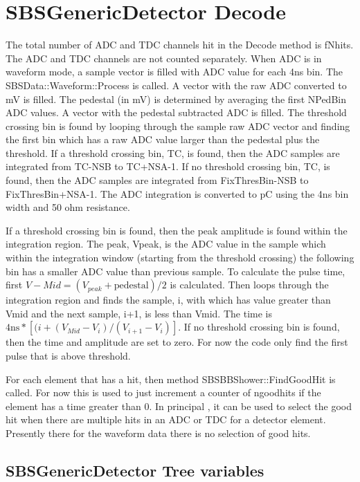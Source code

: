 \documentclass[11pt]{article}
\begin{document}
 


\section{SBSGenericDetector Decode}
The total number of  ADC and TDC channels hit in the Decode method is fNhits. The ADC and TDC channels
are not counted separately. When ADC is in waveform mode, a sample vector is filled with ADC value for
each 4ns bin. The SBSData::Waveform::Process is called.
A vector with the raw ADC converted to mV is filled. The pedestal (in mV) is determined by averaging the first NPedBin ADC values. A vector with the pedestal subtracted ADC is filled.
The threshold crossing bin is found by looping through the sample raw ADC vector and finding the first bin which has a raw ADC value larger than the pedestal plus the threshold.
If a threshold crossing bin, TC, is found, then the ADC samples are integrated from TC-NSB to TC+NSA-1.
If no  threshold crossing bin, TC, is found, then the ADC samples are integrated from FixThresBin-NSB to FixThresBin+NSA-1.
The ADC integration is converted to pC using the 4ns bin width and 50 ohm resistance.

If a threshold crossing bin is found, then the peak amplitude is found within the integration region. The peak, Vpeak,  is the ADC value in the sample which within the integration window (starting from the threshold crossing) the following bin has a smaller ADC value than previous sample.
To calculate the pulse time, first  $V-{Mid} = (V_{peak} + \mbox{pedestal})/2$ is calculated. Then loops through the
integration region and finds the sample, i, with which has value greater than Vmid and the next sample, i+1, is
less than Vmid. The time is $4\mbox{ns}*\left[(i+(V_{Mid}-V_i)/(V_{i+1}-V_i)\right]$.
If no threshold crossing bin is found, then the time and amplitude are set to zero.
For now the code only find the first pulse that is above threshold.

For each element that has a hit, then method SBSBBShower::FindGoodHit is called. For now this
is used to just increment a counter of ngoodhits if the element has a time greater than 0.
In principal , it can be used to select the good hit when there are multiple hits in an ADC or TDC for a detector element. Presently there for the waveform  data there is no selection of good hits.



 

\subsection{SBSGenericDetector Tree variables}
\end{document}
